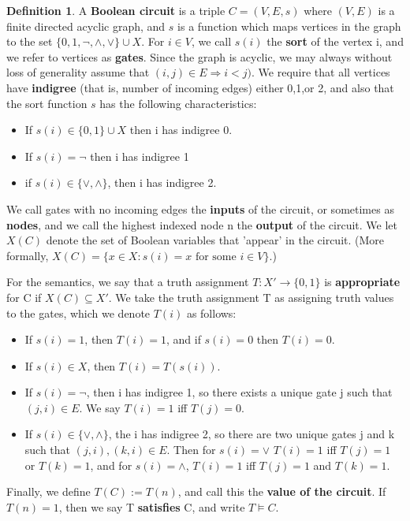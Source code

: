 \documentclass{article}
\theoremstyle{definition}
\newtheorem{definition}{Definition}[section]
\theoremstyle{plain}
\theoremstyle{theorem}
\begin{document}
\begin{definition}
    A \textbf{Boolean circuit} is a triple $C=(V,E,s)$ where $(V,E)$ is a finite directed acyclic graph, and $s$ is a function which maps vertices in the graph to the set $\{0,1,\neg,\wedge,\vee\} \cup X$. For $i \in V$, we call $s(i)$ the \textbf{sort} of the vertex i, and we refer to vertices as \textbf{gates}. Since the graph is acyclic, we may always without loss of generality assume that $(i,j) \in E \Rightarrow i<j)$. We require that all vertices have \textbf{indigree} (that is, number of incoming edges) either 0,1,or 2, and also that the sort function $s$ has the following characteristics:
    \begin{itemize}
        \item If $s(i) \in \{0,1\}\cup X$ then i has indigree 0.
        \item If $s(i) = \neg$ then i has indigree 1
        \item if $s(i) \in \{\vee,\wedge\}$, then i has indigree 2. 
    \end{itemize}
    We call gates with no incoming edges the \textbf{inputs} of the circuit, or sometimes as \textbf{nodes}, and we call the highest indexed node n the \textbf{output} of the circuit. We let $X(C)$ denote the set of Boolean variables that 'appear' in the circuit. (More formally, $X(C) = \{x \in X: s(i)=x\textrm{ for some } i\in V\}$.)
    \par For the semantics, we say that a truth assignment $T:X' \to \{0,1\}$ is \textbf{appropriate} for C if $X(C) \subseteq X'$. We take the truth assignment T as assigning truth values to the gates, which we denote $T(i)$ as follows:
    \begin{itemize}
        \item If $s(i)=1$, then $T(i)=1$, and if $s(i)=0$ then $T(i)=0$.
        \item If $s(i) \in X$, then $T(i)=T(s(i))$.
        \item If $s(i) = \neg$, then i has indigree 1, so there exists a unique gate j such that $(j,i) \in E$. We say $T(i)=1$ iff $T(j)=0$.
        \item If $s(i) \in \{\vee,\wedge\}$, the i has indigree 2, so there are two unique gates j and k such that $(j,i),(k,i) \in E$. Then for $s(i)=\vee$ $T(i)=1$ iff $T(j)=1$ or $T(k)=1$, and for $s(i)=\wedge$, $T(i)=1$ iff $T(j)=1$ and $T(k)=1$.
    \end{itemize}
    Finally, we define $T(C) := T(n)$, and call this the \textbf{value of the circuit}. If $T(n)=1$, then we say T \textbf{satisfies} C, and write $T \models C$.
\end{definition}
\end{document}
